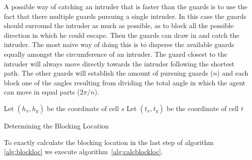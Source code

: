 A possible way of catching an intruder that is faster than the guards is to use the fact that there multiple guards pursuing a single intruder. In this case the guards should surround the intruder as much as possible, as to block all the possible direction in which he could escape. Then the guards can draw in and catch the intruder. The most naive way of doing this is to disperse the available guards equally amongst the circumference of an intruder. The guard closest to the intruder will always move directly towards the intruder following the shortest path. The other guards will establish the amount of pursuing guards ($n$) and each block one of the angles resulting from dividing the total angle in which the agent can move in equal parts ($2\pi / n$)\cite{undeger2010multi, undeger2007single, undeger2009real}.


		\begin{algorithm}
			Let $(h_x,h_y)$ be the coordinate of cell $s$\;
			Let $(t_x,t_y)$ be the coordinate of cell $t$\;
			\label{alg:blockloc}
			\caption{Determining the Blocking Location}
		\end{algorithm}

			To exactly calculate the blocking location in the last step of algorithm \ref{alg:blockloc} we execute algorithm~\ref{alg:calcblockloc}.

